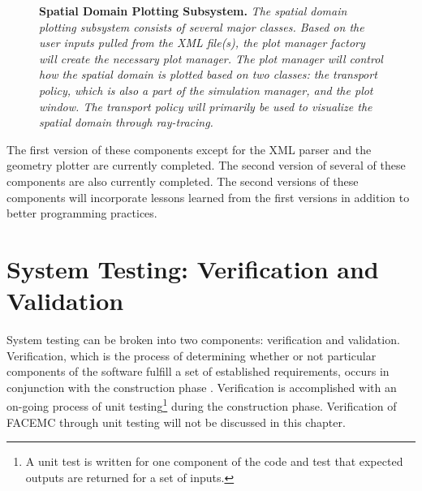 \begin{figure}[t!]
  \begin{center}
  \end{center}
  \caption{\textbf{Spatial Domain Plotting Subsystem.}
    \textit{The spatial domain plotting subsystem consists of several major
      classes. Based on the user inputs pulled from the XML file(s), the 
      plot manager factory will create the necessary plot manager. The plot
      manager will control how the spatial domain is plotted based on two
      classes: the transport policy, which is also a part of the simulation 
      manager, and the plot window. The transport policy will primarily be used
      to visualize the spatial domain through ray-tracing.}}
  \label{fig:spatial_domain_plotter}
\end{figure}

The first version of these components except for the XML parser and the geometry
plotter are currently completed. The second version of several of these 
components are also currently completed. The second versions of these 
components will incorporate lessons learned from the first versions in addition 
to better programming practices. 

\section{System Testing: Verification and Validation}
System testing can be broken into two components: verification and validation. 
Verification, which is the process of determining whether or not particular 
components of the software fulfill a set of established requirements, occurs
in conjunction with the construction phase \citep{procassini_verification_2004}.
Verification is accomplished with an on-going process of unit 
testing\footnote{A unit test is written for one component of the code and test 
that expected outputs are returned for a set of inputs.} during the 
construction phase. Verification of FACEMC through unit testing will not be 
discussed in this chapter. 


